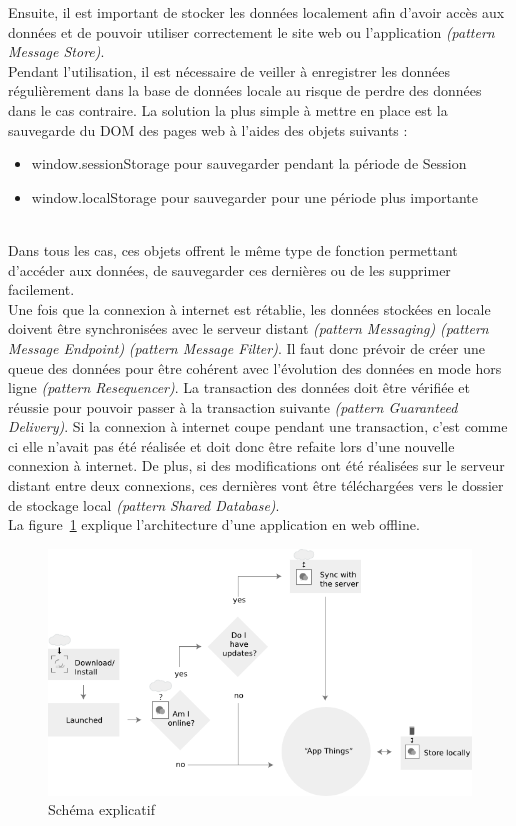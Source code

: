 	Ensuite, il est important de stocker les données localement afin d’avoir accès aux données et de pouvoir utiliser correctement le site web ou l’application \textit{(pattern Message Store)}. \\

	Pendant l’utilisation, il est nécessaire de veiller à enregistrer les données régulièrement dans la base de données locale au risque de perdre des données dans le cas contraire. La solution la plus simple à mettre en place est la sauvegarde du DOM des pages web à l’aides des objets suivants :

	\begin{itemize}
		\item window.sessionStorage pour sauvegarder pendant la période de Session
		\item window.localStorage pour sauvegarder pour une période plus importante
	\end{itemize}
	~\\

	Dans tous les cas, ces objets offrent le même type de fonction permettant d'accéder aux données, de sauvegarder ces dernières ou de les supprimer facilement.\\

	Une fois que la connexion à internet est rétablie, les données stockées en locale doivent être synchronisées avec le serveur distant \textit{(pattern Messaging)} \textit{(pattern Message Endpoint)} \textit{(pattern Message Filter)}. Il faut donc prévoir de créer une queue des données pour être cohérent avec l’évolution des données en mode hors ligne \textit{(pattern Resequencer)}. La transaction des données doit être vérifiée et réussie pour pouvoir passer à la transaction suivante \textit{(pattern Guaranteed Delivery)}. Si la connexion à internet coupe pendant une transaction, c’est comme ci elle n’avait pas été réalisée et doit donc être refaite lors d’une nouvelle connexion à internet. De plus, si des modifications ont été réalisées sur le serveur distant entre deux connexions, ces dernières vont être téléchargées vers le dossier de stockage local \textit{(pattern Shared Database)}.\\

La figure~\ref{schema} explique l'architecture d'une application en web offline.

 \begin{figure}[H]
  \centering
  \includegraphics[width=18cm]{./images/schema.png}
  \caption{Schéma explicatif}
  \label{schema}
 \end{figure}

